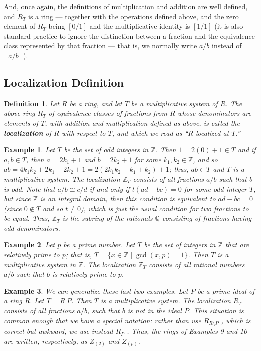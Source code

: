 \documentclass[12pt,reqno]{amsart}
\theoremstyle{plain}
\newtheorem{defi}{Definition}
\newtheorem{ex}{Example}
\newcommand{\zz}{\mathbb Z}
\newcommand{\qq}{\mathbb Q}
\begin{document}
And, once again, the definitions of multiplication and addition are well defined, and $R_T$ is a ring — together with the operations defined above, and the zero element of $R_T$ being $[0/1]$ and the multiplicative identity is $[1/1]$ (it is also standard practice to ignore the distinction between a fraction and the equivalence class represented by that fraction — that is, we normally write $a/b$ instead of $[a/b]$).
 
\subsection{Localization Definition}\begin{defi} Let $R$ be a ring, and let $T$ be a multiplicative system of $R$. The above ring $R_T$ of equivalence classes of fractions from $R$ whose denominators are elements of $T$, with addition and multiplication defined as above, is called the \textbf{localization} of $R$ with respect to $T$, and which we read as ``$R$ localized at $T$.” 
\end{defi} 
\begin{ex} Let $T$ be the set of odd integers in $\zz$. Then $1 = 2(0)+1 \in T$ and if $a, b \in T$, then $a=2k_1 +1 $ and $b=2k_2 + 1$ for some $k_1, k_2 \in \zz$, and so $ab = 4k_1 k_2 +2 k_1 + 2k_2 + 1 = 2(2k_1 k_2 + k_1 + k_2) + 1$; thus, $ab \in T$ and $T$ is a multiplicative system.  The localization $\zz_T$ consists of all fractions $a/b$ such that $b$ is odd. Note that $a/b \cong c/d$ if and only if $t(ad-bc) = 0$ for some odd integer $T$, but since $\zz$ is an integral domain, then this condition is equivalent to $ad-bc = 0$ (since $0 \notin T$ and so $t \neq 0$), which is just the usual condition for two fractions to be equal. Thus, $\zz_T$ is the subring of the rationals $\qq$ consisting of fractions having odd denominators. 
\end{ex} 
\begin{ex} Let $p$ be a prime number. Let $T$ be the set of integers in $\zz$ that are relatively prime to $p$; that is, $T = \{ x \in \zz \mid \gcd (x, p ) = 1\}$. Then $T$ is a multiplicative system in $\zz$. The localization $\zz_T$ consists of all rational numbers $a/b$ such that $b$ is relatively prime to $p$.
\end{ex} 
\begin{ex} 
We can generalize these last two examples. Let $P$ be a prime ideal of a ring R. Let $T = R \ P$. Then $T$ is a multiplicative system. The localization $R_T$ consists of all fractions $a/b$, such that $b$ is not in the ideal $P$. This situation is common enough that we have a special notation: rather than use $R_{ R \setminus P}$ , which is correct but awkward, we use instead $R_P$ . Thus, the rings of Examples 9 and 10 are written, respectively, as $Z_{(2)}$ and $Z_{(p)}$.
\end{ex} 
\end{document}
